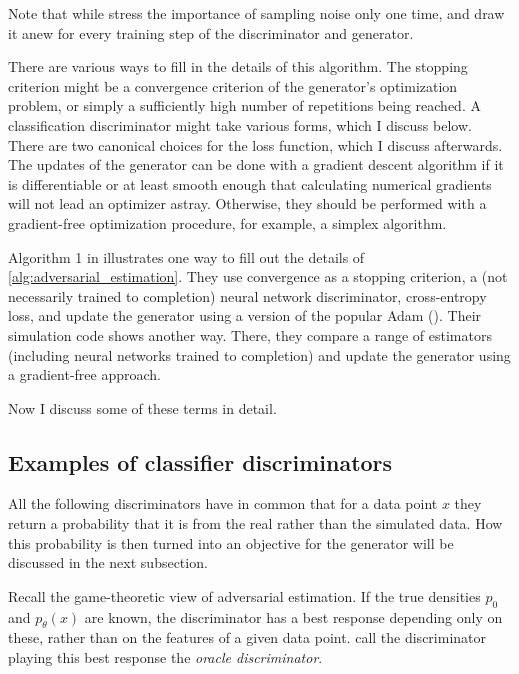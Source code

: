 Note that while \textcite{kaji2023adversarial} stress the importance of sampling noise only one time, \textcite{goodfellow2014generative} and \textcite{athey2021using} draw it anew for every training step of the discriminator and generator.

There are various ways to fill in the details of this algorithm.
The stopping criterion might be a convergence criterion of the generator's optimization problem, or simply a sufficiently high number of repetitions being reached.
A classification discriminator might take various forms, which I discuss below.
There are two canonical choices for the loss function, which I discuss afterwards.
The updates of the generator can be done with a gradient descent algorithm if it is differentiable or at least smooth enough that calculating numerical gradients will not lead an optimizer astray.
Otherwise, they should be performed with a gradient-free optimization procedure, for example, a simplex algorithm. %

Algorithm 1 in \textcite{kaji2023adversarial} illustrates one way to fill out the details of \ref{alg:adversarial_estimation}.
They use convergence as a stopping criterion, a (not necessarily trained to completion) neural network discriminator, cross-entropy loss, and update the generator using a version of the popular Adam (\cite{diederik2014adam}).
Their simulation code shows another way. %
There, they compare a range of estimators (including neural networks trained to completion) and update the generator using a gradient-free approach.

Now I discuss some of these terms in detail.

\subsection{Examples of classifier discriminators}
\label{sec:discriminators}
All the following discriminators have in common that for a data point $x$ they return a probability that it is from the real rather than the simulated data.
How this probability is then turned into an objective for the generator will be discussed in the next subsection.

Recall the game-theoretic view of adversarial estimation.
If the true densities $p_0$ and $p_\theta(x)$ are known, the discriminator has a best response depending only on these, rather than on the features of a given data point.
\textcite{kaji2023adversarial} call the discriminator playing this best response the \textit{oracle discriminator}. %

